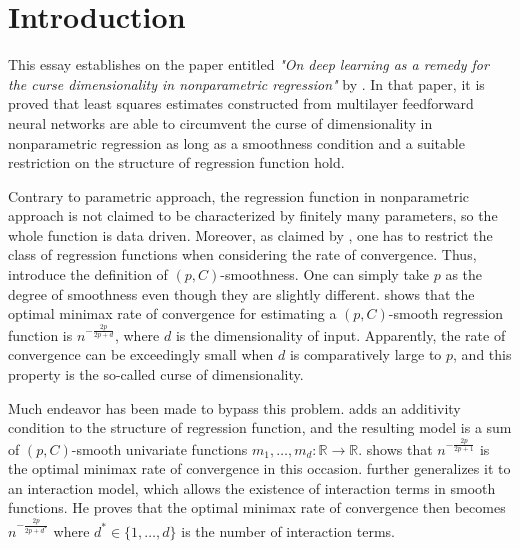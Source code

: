 \section{Introduction}
\label{sec:introduction}

This essay establishes on the paper entitled \textit{"On deep learning as a remedy for the curse dimensionality in nonparametric regression"} by \cite{Bauer2019}. In that paper, it is proved that least squares estimates constructed from multilayer feedforward neural networks are able to circumvent the curse of dimensionality in nonparametric regression as long as a smoothness condition and a suitable restriction on the structure of regression function hold. 

Contrary to parametric approach, the regression function in nonparametric approach is not claimed to be characterized by finitely many parameters, so the whole function is data driven. Moreover, as claimed by \cite{Gyoerfi2002}, one has to restrict the class of regression functions when considering the rate of convergence. Thus, \cite{Bauer2019} introduce the definition of $(p,C)$-smoothness. One can simply take $p$ as the degree of smoothness even though they are slightly different. \cite{Stone1982} shows that the optimal minimax rate of convergence for estimating a $(p,C)$-smooth regression function is $n^{-\frac{2p}{2p+d}}$, where $d$ is the dimensionality of input. Apparently, the rate of convergence can be exceedingly small when $d$ is comparatively large to $p$, and this property is the so-called curse of dimensionality.

Much endeavor has been made to bypass this problem. \cite{Stone1985} adds an additivity condition to the structure of regression function, and the resulting model is a sum of $(p,C)$-smooth univariate functions $m_1,\ldots,m_d: \mathbb{R} \rightarrow \mathbb{R}$. \cite{Stone1985} shows that $n^{-\frac{2p}{2p+1}}$ is the optimal minimax rate of convergence in this occasion. \cite{Stone1994} further generalizes it to an interaction model, which allows the existence of interaction terms in smooth functions. He proves that the optimal minimax rate of convergence then becomes $n^{-\frac{2p}{2p+d^{*}}}$ where $d^{*}  \in \{1,\ldots,d\}$ is the number of interaction terms. 

